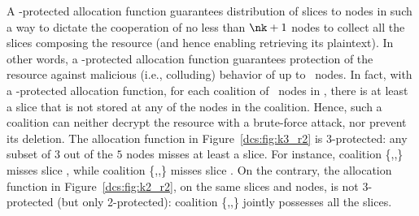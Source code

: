 A \nk-protected allocation function guarantees distribution of slices
to nodes in such a way to dictate the cooperation of no less than
$\nk+1$ nodes to collect all the slices composing the resource (and
hence enabling retrieving its plaintext). In other words, a
\nk-protected allocation function guarantees protection of the
resource against malicious (i.e., colluding) behavior of up to
\nk\ nodes. In fact, with a \K-protected allocation function, for each
coalition of \K\ nodes in \Nodes, there is at least a slice that is
not stored at any of the nodes in the coalition. Hence, such a
coalition can neither decrypt the resource with a brute-force attack,
nor prevent its deletion. The allocation function in
Figure~\ref{dcs:fig:k3_r2} is 3-protected: any subset of $3$ out of the
$5$ nodes misses at least a slice.  For instance, coalition
\{,,\} misses slice , while
coalition \{,,\} misses slice . On
the contrary, the allocation function in Figure~\ref{dcs:fig:k2_r2}, on
the same slices and nodes, is not 3-protected (but only 2-protected):
coalition \{,,\} jointly possesses all the
slices.

